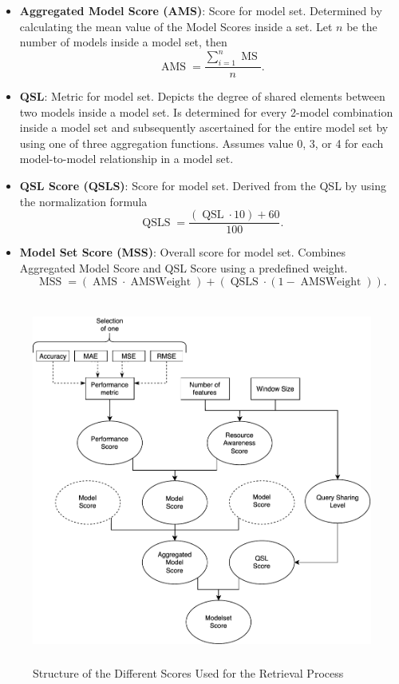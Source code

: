 \begin{itemize}
\item \textbf{Aggregated Model Score (AMS)}: Score for model set. Determined by calculating the mean value of the Model Scores inside a set. Let $n$ be the number of models inside a model set, then
\begin{equation}
  \operatorname{AMS} = \frac{\sum_{i=1}^{n} \operatorname{MS}}{n}.
  \label{ams}
  \end{equation}
  
\item \textbf{QSL}: Metric for model set. Depicts the degree of shared elements between two models inside a model set. Is determined for every 2-model combination inside a model set and subsequently ascertained for the entire model set by using one of three aggregation functions. Assumes value 0, 3, or 4 for each model-to-model relationship in a model set.

\item \textbf{QSL Score (QSLS)}: Score for model set. Derived from the QSL by using the normalization formula
\begin{equation}
  \operatorname{QSLS} = \frac{(\operatorname{QSL} \cdot 10) + 60}{100}.
  \label{qsls}
  \end{equation}
  
\item \textbf{Model Set Score (MSS)}: Overall score for model set. Combines Aggregated Model Score and QSL Score using a predefined weight.
\begin{equation}
  \operatorname{MSS} = (\operatorname{AMS} \cdot \operatorname{AMSWeight}) + (\operatorname{QSLS} \cdot (1- \operatorname{AMSWeight})).
   \label{mss}
   \end{equation}
\end{itemize}


\begin{figure}[htb]
  \centering
\includegraphics[height=12cm]{graphics/scores.pdf}
  \caption{Structure of the Different Scores Used for the Retrieval Process}
  \label{scoreconstruction}
\end{figure}



